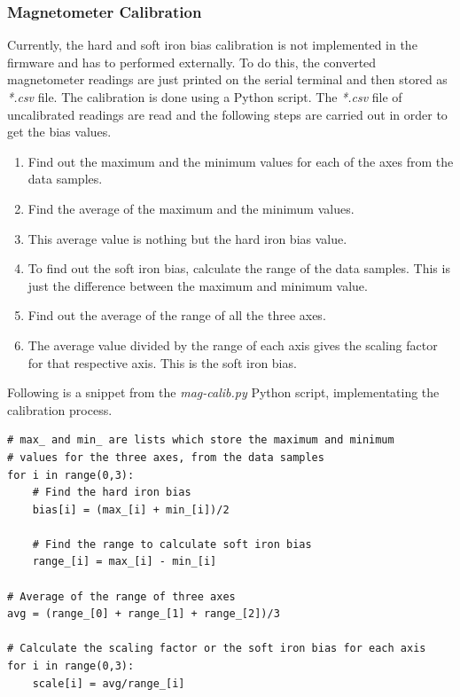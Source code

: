 \documentclass[a4paper,12pt,oneside]{book}
\begin{document}
\subsubsection{Magnetometer Calibration}
\label{sssec:mag_calib}

Currently, the hard and soft iron bias calibration is not implemented in the firmware and has to performed externally. To do this, the converted magnetometer readings are just printed on the serial terminal and then stored as \textit{*.csv} file. The calibration is done using a Python script. The \textit{*.csv} file of uncalibrated readings are read and the following steps are carried out in order to get the bias values.\\

\begin{enumerate}
\item Find out the maximum and the minimum values for each of the axes from the data samples.\\
\item Find the average of the maximum and the minimum values.\\
\item This average value is nothing but the hard iron bias value.\\
\item To find out the soft iron bias, calculate the range of the data samples. This is just the difference between the maximum and minimum value.\\
\item Find out the average of the range of all the three axes.\\
\item The average value divided by the range of each axis gives the scaling factor for that respective axis. This is the soft iron bias.\\
\end{enumerate}

Following is a snippet from the \textit{mag-calib.py} Python script, implementating the calibration process.\\

\begin{verbatim}
# max_ and min_ are lists which store the maximum and minimum 
# values for the three axes, from the data samples
for i in range(0,3):
    # Find the hard iron bias
    bias[i] = (max_[i] + min_[i])/2
    
    # Find the range to calculate soft iron bias
    range_[i] = max_[i] - min_[i]

# Average of the range of three axes
avg = (range_[0] + range_[1] + range_[2])/3

# Calculate the scaling factor or the soft iron bias for each axis
for i in range(0,3):
    scale[i] = avg/range_[i]
\end{verbatim}
\end{document}
